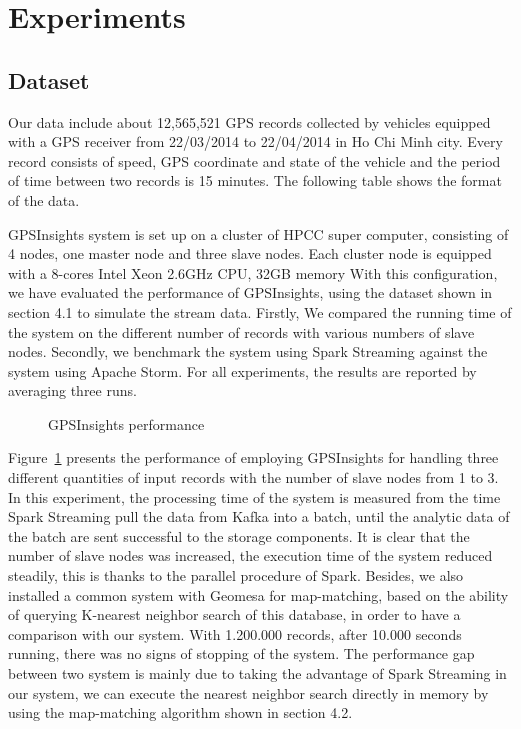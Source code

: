 \documentclass{acm_proc_article-sp}
\begin{document}
\section{Experiments}

\subsection{Dataset}

Our data include about 12,565,521 GPS records collected by vehicles equipped with a GPS receiver from 22/03/2014 to 22/04/2014 in Ho Chi Minh city. Every record consists of speed, GPS coordinate and state of the vehicle and the period of time between two records is 15 minutes. The following table shows the format of the data.

	GPSInsights system is set up on a cluster of HPCC super computer, consisting of 4 nodes, one master node and three slave nodes. Each cluster node is equipped with a  8-cores Intel Xeon 2.6GHz CPU, 32GB memory 
	With this configuration, we have evaluated the performance of GPSInsights, using the dataset shown in section 4.1 to simulate the stream data. Firstly, We compared the running time of the system on the different number of records with various numbers of slave nodes. Secondly, we benchmark the system using Spark Streaming against the system using Apache Storm. For all experiments, the results are reported by averaging three runs. 
	
	
	\begin{figure}[h]
		\centering
		\caption{GPSInsights performance}
		\label{fig:performance}
	\end{figure}

Figure~\ref{fig:performance} presents the performance of employing GPSInsights for handling three different quantities of input records with the number of slave nodes from 1 to 3. In this experiment, the processing time of the system is measured from the time Spark Streaming pull the data from Kafka into a batch, until the analytic data of the batch are sent successful to the storage components. It is clear that the number of slave nodes was increased, the execution time of the system reduced steadily, this is thanks to the parallel procedure of Spark. Besides, we also installed a common system with Geomesa for map-matching, based on the ability of querying K-nearest neighbor search of this database, in order to have a comparison with our system. With 1.200.000 records, after 10.000 seconds running, there was no signs of stopping of the system. The performance gap between two system is mainly due to taking the advantage of Spark Streaming in our system,  we can execute the nearest neighbor search directly in memory by using the map-matching algorithm shown in section 4.2.
\end{document}
